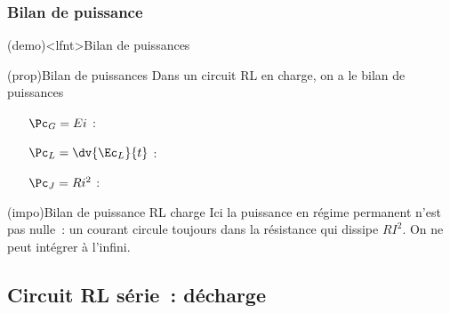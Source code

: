 \documentclass[../../main/main.tex]{subfiles}
\begin{document}
\subsubsection{Bilan de puissance}

\begin{tcb}[label=demo:rlpuiss-charge](demo)<lfnt>{Bilan de puissances}
	\vspace{-15pt}
	\vspace{-15pt}
\end{tcb}
\begin{tcb}[label=prop:rlpuiss-charge](prop){Bilan de puissances}
	Dans un circuit RL en charge, on a le bilan de puissances
	\psw{
		\[
			\boxed{\Pc_G = \Pc_L + \Pc_J}
		\]
	}
	\vspace{-15pt}
	\begin{itemize}[leftmargin=50pt]
		\item[$\Pc_G = Ei$] : 
		\item[$\Pc_L = \dv{\Ec_L}{t}$] : 
		\item[$\Pc_J = Ri^{2}$] : 
	\end{itemize}
\end{tcb}

\begin{tcb}(impo){Bilan de puissance RL charge}
	Ici la puissance en régime permanent n'est pas nulle~: un courant circule
	toujours dans la résistance qui dissipe $RI^2$. On ne peut intégrer à
	l'infini.
\end{tcb}

\subsection{Circuit RL série~: décharge}
\end{document}
